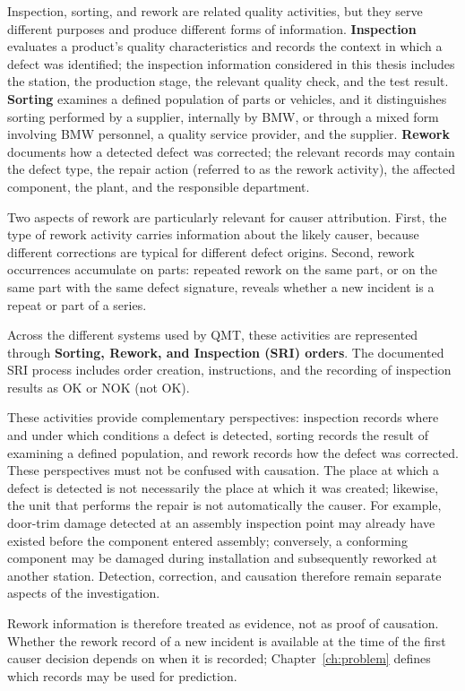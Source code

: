 Inspection, sorting, and rework are related quality activities, but they
serve different purposes and produce different forms of information.
\textbf{Inspection} evaluates a product's quality characteristics and
records the context in which a defect was identified; the inspection
information considered in this thesis includes the station, the
production stage, the relevant quality check, and the test result.
\textbf{Sorting} examines a defined population of parts or vehicles, and
it distinguishes sorting performed by a supplier, internally by BMW, or
through a mixed form involving BMW personnel, a quality service provider,
and the supplier. \textbf{Rework} documents how a detected defect was
corrected; the relevant records may contain the defect type, the repair
action (referred to as the rework activity), the affected component, the
plant, and the responsible department.

Two aspects of rework are particularly relevant for causer attribution.
First, the type of rework activity carries information about the likely
causer, because different corrections are typical for different defect
origins. Second, rework occurrences accumulate on parts: repeated rework
on the same part, or on the same part with the same defect signature,
reveals whether a new incident is a repeat or part of a series.

Across the different systems used by QMT, these activities are
represented through \textbf{Sorting, Rework, and Inspection (SRI) orders}.
The documented SRI process includes order creation, instructions, and the
recording of inspection results as OK or NOK (not OK).

These activities provide complementary perspectives: inspection records
where and under which conditions a defect is detected, sorting records the
result of examining a defined population, and rework records how the
defect was corrected. These perspectives must not be confused with
causation. The place at which a defect is detected is not necessarily the
place at which it was created; likewise, the unit that performs the repair
is not automatically the causer. For example, door-trim damage detected at
an assembly inspection point may already have existed before the
component entered assembly; conversely, a conforming component may be
damaged during installation and subsequently reworked at another station.
Detection, correction, and causation therefore remain separate aspects of
the investigation.

Rework information is therefore treated as evidence, not as proof of
causation. Whether the rework record of a new incident is available at the
time of the first causer decision depends on when it is recorded;
Chapter~\ref{ch:problem} defines which records may be used for prediction.


